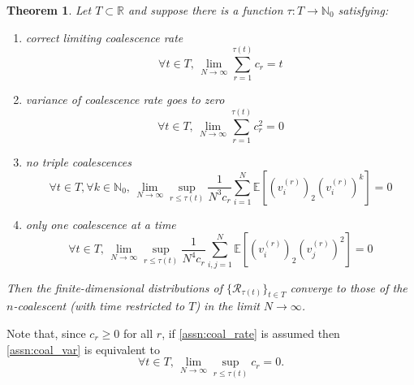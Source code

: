 \documentclass{article}
\newcommand{\E}{\mathbb{E}}
\newtheorem{thm}{Theorem}
\begin{document}
\begin{thm}\label{thm:mohle1}
Let $T \subset \mathbb{R}$ and suppose there is a function $\tau : T \to \mathbb{N}_0$ satisfying:
\begin{enumerate}[label=(\Alph*)]
\item\label{assn:coal_rate} correct limiting coalescence rate
\begin{equation*}
\forall t \in T, \,\lim_{N\to\infty} \sum_{r=1}^{\tau(t)} c_r =t
\end{equation*}
\item\label{assn:coal_var} variance of coalescence rate goes to zero
\begin{equation*}
\forall t \in T, \,\lim_{N\to\infty} \sum_{r=1}^{\tau(t)} c_r^2 =0
\end{equation*}
\item\label{assn:triple_coal} no triple coalescences
\begin{equation*}
\forall t \in T, \forall k\in\mathbb{N}_0,\, \lim_{N\to\infty} \sup_{r\leq\tau(t)} \frac{1}{N^3 c_r} \sum_{i=1}^N \E\left[ (v_i^{(r)})_2 (v_i^{(r)})^k \right] =0
\end{equation*}
\item\label{assn:multi_coal} only one coalescence at a time
\begin{equation*}
\forall t \in T,\, \lim_{N\to\infty} \sup_{r\leq\tau(t)} \frac{1}{N^4 c_r} \sum_{i,j=1}^N \E\left[ (v_i^{(r)})_2 (v_j^{(r)})^2 \right] =0
\end{equation*}
\end{enumerate}
Then the finite-dimensional distributions of $\{\mathcal{R}_{\tau(t)}\}_{t\in T}$ converge to those of the $n$-coalescent (with time restricted to $T$) in the limit $N\to\infty$.
\end{thm}
Note that, since $c_r \geq 0$ for all $r$, if \ref{assn:coal_rate} is assumed then \ref{assn:coal_var} is equivalent to
\begin{equation*}
\forall t \in T,\, \lim_{N\to\infty} \sup_{r\leq\tau(t)} c_r =0.
\end{equation*}
\end{document}
